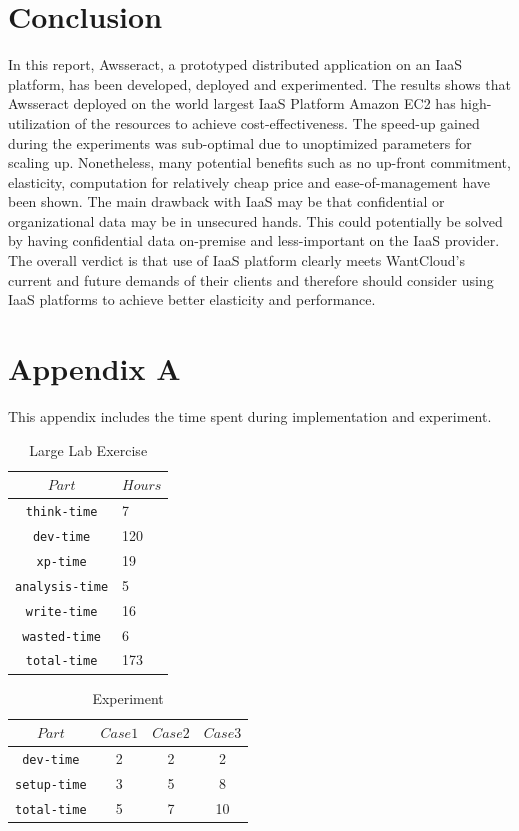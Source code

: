 \documentclass[conference]{IEEEtran}
\begin{document}
\section{Conclusion}\label{sec:conclusion}
In this report, Awsseract, a prototyped distributed application on an IaaS platform, has been developed, deployed and experimented. The results shows that Awsseract deployed on the world largest IaaS Platform Amazon EC2 has high-utilization of the resources to achieve cost-effectiveness. The speed-up gained during the experiments was sub-optimal due to unoptimized parameters for scaling up. Nonetheless, many potential benefits such as no up-front commitment, elasticity, computation for relatively cheap price and ease-of-management have been shown. The main drawback with IaaS may be that confidential or organizational data may be in unsecured hands. This could potentially be solved by having confidential data on-premise and less-important on the IaaS provider. The overall verdict is that use of IaaS platform clearly meets WantCloud's current and future demands of their clients and therefore should consider using IaaS platforms to achieve better elasticity and performance. 




\section{Appendix A}
This appendix includes the time spent during implementation and experiment. 

\begin{table}[h]
\renewcommand{\arraystretch}{1.3}
\caption{Large Lab Exercise}\label{tab:exe}
\centering
\begin{tabular*}{4cm}{c|p{5cm}}
    \hline
    $Part$&$Hours$\\
    \hline
    \texttt{think-time} & 7 \\
    \texttt{dev-time} & 120 \\
    \texttt{xp-time} & 19 \\
    \texttt{analysis-time} & 5 \\
    \texttt{write-time} & 16 \\
    \texttt{wasted-time} & 6 \\
    \hline \hline
    \texttt{total-time} & 173 \\
    \hline
\end{tabular*}
\end{table}

\begin{table}[h]
\renewcommand{\arraystretch}{1.3}
\caption{Experiment }\label{tab:xp}
\centering
\begin{tabular*}{5.5cm}{c|c|c|c}
    \hline
    $Part$&$Case1$&$Case2$&$Case3$\\
    \hline
    \texttt{dev-time} &2 &2 &2  \\
    \texttt{setup-time} &3 &5 &8 \\
    \hline \hline
    \texttt{total-time} &5 &7 &10 \\
    \hline
\end{tabular*}
\end{table}
\end{document}
